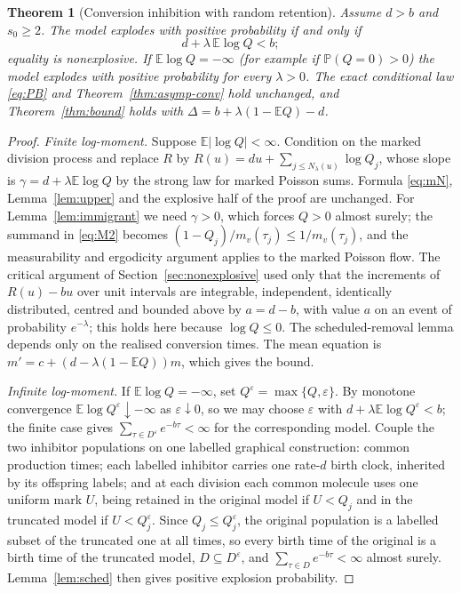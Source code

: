 \documentclass[11pt,a4paper]{article}
\numberwithin{equation}{section}
\newtheorem{theorem}{Theorem}[section]
\theoremstyle{definition}\newtheorem{definition}[theorem]{Definition}
\theoremstyle{remark}\newtheorem{remark}[theorem]{Remark}\newtheorem{example}[theorem]{Example}
\newcommand{\E}{\mathbb E}
\renewcommand{\P}{\mathbb P}
\begin{document}
\begin{theorem}[Conversion inhibition with random retention]\label{thm:randomQ-conv}
Assume $d>b$ and $s_0\ge2$. The model explodes with positive probability if and only if
\begin{equation}\label{eq:randomQ-conv}
d+\lambda\,\E\log Q<b ;
\end{equation}
equality is nonexplosive. If $\E\log Q=-\infty$ (for example if $\P(Q=0)>0$) the model explodes with positive probability for every $\lambda>0$. The exact conditional law \eqref{eq:PB} and Theorem~\ref{thm:asymp-conv} hold unchanged, and Theorem~\ref{thm:bound} holds with $\Delta=b+\lambda(1-\E Q)-d$.
\end{theorem}

\begin{proof}
\emph{Finite log-moment.} Suppose $\E|\log Q|<\infty$. Condition on the marked division process and replace $R$ by $R(u)=du+\sum_{j\le N_\lambda(u)}\log Q_j$, whose slope is $\gamma=d+\lambda\E\log Q$ by the strong law for marked Poisson sums. Formula \eqref{eq:mN}, Lemma~\ref{lem:upper} and the explosive half of the proof are unchanged. For Lemma~\ref{lem:immigrant} we need $\gamma>0$, which forces $Q>0$ almost surely; the summand in \eqref{eq:M2} becomes $(1-Q_j)/m_v(\tau_j)\le1/m_v(\tau_j)$, and the measurability and ergodicity argument applies to the marked Poisson flow. The critical argument of Section~\ref{sec:nonexplosive} used only that the increments of $R(u)-bu$ over unit intervals are integrable, independent, identically distributed, centred and bounded above by $a=d-b$, with value $a$ on an event of probability $e^{-\lambda}$; this holds here because $\log Q\le0$. The scheduled-removal lemma depends only on the realised conversion times. The mean equation is $m'=c+(d-\lambda(1-\E Q))m$, which gives the bound.

\emph{Infinite log-moment.} If $\E\log Q=-\infty$, set $Q^\varepsilon=\max\{Q,\varepsilon\}$. By monotone convergence $\E\log Q^\varepsilon\downarrow-\infty$ as $\varepsilon\downarrow0$, so we may choose $\varepsilon$ with $d+\lambda\E\log Q^\varepsilon<b$; the finite case gives $\sum_{\tau\in D^\varepsilon}e^{-b\tau}<\infty$ for the corresponding model. Couple the two inhibitor populations on one labelled graphical construction: common production times; each labelled inhibitor carries one rate-$d$ birth clock, inherited by its offspring labels; and at each division each common molecule uses one uniform mark $U$, being retained in the original model if $U<Q_j$ and in the truncated model if $U<Q_j^\varepsilon$. Since $Q_j\le Q^\varepsilon_j$, the original population is a labelled subset of the truncated one at all times, so every birth time of the original is a birth time of the truncated model, $D\subseteq D^\varepsilon$, and $\sum_{\tau\in D}e^{-b\tau}<\infty$ almost surely. Lemma~\ref{lem:sched} then gives positive explosion probability.
\end{proof}
\end{document}
